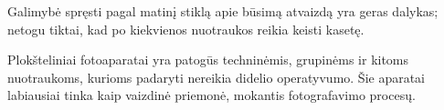 \documentclass{book}
\begin{document}
			Galimybė spręsti pagal matinį stiklą apie būsimą atvaizdą yra geras dalykas; netogu tiktai, kad po kiekvienos nuotraukos reikia keisti kasetę.

			Plokšteliniai fotoaparatai yra patogūs techninėmis, grupinėms ir kitoms nuotraukoms, kurioms padaryti nereikia didelio operatyvumo. Šie aparatai labiausiai tinka kaip vaizdinė priemonė, mokantis fotografavimo procesų.
\end{document}
